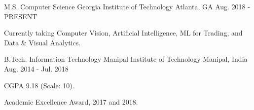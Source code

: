 

\begin{cventries}

  \cventry
    {M.S. Computer Science} %
    {Georgia Institute of Technology} %
    {Atlanta, GA} %
    {Aug. 2018 - PRESENT} %
    {
    	\begin{cvitems} %
  		  \item Currently taking Computer Vision, Artificial Intelligence, ML for Trading, and Data \& Visual Analytics.
  		\end{cvitems}
    }
    
  \cventry
    {B.Tech. Information Technology} %
    {Manipal Institute of Technology} %
    {Manipal, India} %
    {Aug. 2014 - Jul. 2018} %
    {
      \begin{cvitems} %
			\item {CGPA 9.18 (Scale: 10).}
	  	\item {Academic Excellence Award, 2017 and 2018.}
      \end{cvitems}
    }

\end{cventries}
